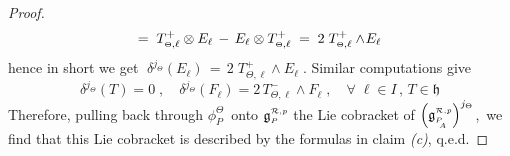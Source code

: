 \documentclass[10pt,a4paper]{amsart}
\def \Ppicc {{\scriptscriptstyle P}}
\def \Thetapicc {{\scriptscriptstyle \Theta}}
\def \liegRpP{\mathfrak{g}^{\raise1pt\hbox{$ \scriptscriptstyle \mathcal{R},p $}}_\Ppicc}
\def \liegRpPa{\mathfrak{g}^{\raise1pt\hbox{$ \scriptscriptstyle \mathcal{R},p $}}_{\Ppicc_{\raise-3pt\hbox{$ \scriptscriptstyle \!\! A $}}}}
\def \lieh{\mathfrak{h}}
\begin{document}
\begin{proof}
$${   \hfill   = \;  T^+_{\Thetapicc,\ell} \otimes E_\ell \, - \, E_\ell \otimes T^+_{\Thetapicc,\ell}  \; = \; 2 \;
   T^+_{\Thetapicc,\ell} \wedge \! E_\ell  }  $$
%
 hence in short we get  $ \; \delta^{j_\Thetapicc}(E_\ell) \, = \, 2 \; T^+_{\Thetapicc,\ell} \wedge \! E_\ell  \; $.
 Similar computations give
%
  $$
 \delta^{j_\Thetapicc}(T) = 0  \; ,   \!\quad
 \delta^{j_\Thetapicc}(F_\ell) = 2 \, T^-_{\Thetapicc,\ell} \wedge \! F_\ell  \; ,   \quad  \forall \; \ell \in I \, , \, T \!\in \lieh  $$
%
 Therefore, pulling back through  $ \phi_\Ppicc^\Thetapicc \, $  onto  $ \liegRpP $  the Lie cobracket of  $ {\Big( \liegRpPa \Big)}^{j_\Thetapicc} $,  \,we find that this Lie cobracket is described by the formulas in claim  \textit{(c)},  q.e.d.
%
\end{proof}
\end{document}
